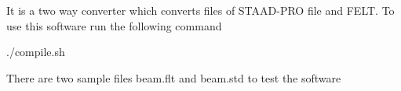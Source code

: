 It is a two way converter which converts files of S\+T\+A\+A\+D-\/\+P\+R\+O file and F\+E\+L\+T. To use this software run the following command

./compile.sh

There are two sample files beam.\+flt and beam.\+std to test the software 